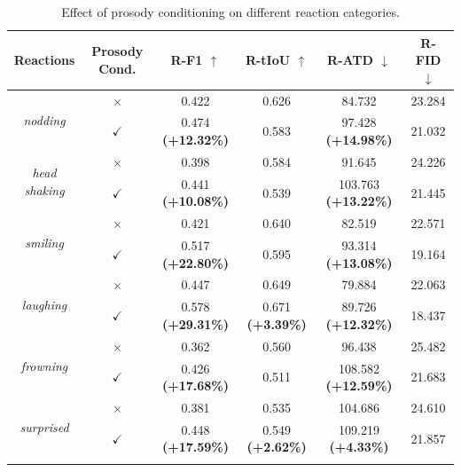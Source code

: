 \vspace{0.5em}
\begin{table}[t]
    \centering
    \fontsize{8pt}{6.5pt}\selectfont
    \setcellgapes{2pt}
    \makegapedcells
    \setlength{\tabcolsep}{2pt}
    \caption{Effect of prosody conditioning on different reaction categories.}
    \label{tab:prosody_conditioning}
    \begin{tabular}{c|c|c|c|c|c}
        \Xhline{1.2pt}
        
        \textbf{Reactions} & \textbf{Prosody Cond.} & \textbf{R-F1} $\uparrow$ & \textbf{R-tIoU} $\uparrow$ & \textbf{R-ATD} $\downarrow$ & \textbf{R-FID} $\downarrow$ \\
        \hline
        
        \multirow{2}{*}{\textit{nodding}} & $\times$ & 0.422 & 0.626 & 84.732 & 23.284 \\
         & $\checkmark$ & 0.474 \textbf{(+12.32\%)} & 0.583 & 97.428 \textbf{(+14.98\%)} & 21.032 \\

        \hline
        
        \multirow{2}{*}{\textit{head shaking}} & $\times$ & 0.398 & 0.584 & 91.645 & 24.226 \\
         & $\checkmark$ & 0.441 \textbf{(+10.08\%)} & 0.539 & 103.763 \textbf{(+13.22\%)} & 21.445 \\
        
        \hline
        
        \multirow{2}{*}{\textit{smiling}} & $\times$ & 0.421 & 0.640 & 82.519 & 22.571 \\
         & $\checkmark$ & 0.517 \textbf{(+22.80\%)} & 0.595 & 93.314 \textbf{(+13.08\%)} & 19.164 \\
        
        \hline
        
        \multirow{2}{*}{\textit{laughing}} & $\times$ & 0.447 & 0.649 & 79.884 & 22.063 \\
         & $\checkmark$ & 0.578 \textbf{(+29.31\%)} & 0.671 \textbf{(+3.39\%)} & 89.726 \textbf{(+12.32\%)} & 18.437 \\
        
        \hline
        
        \multirow{2}{*}{\textit{frowning}} & $\times$ & 0.362 & 0.560 & 96.438 & 25.482 \\
         & $\checkmark$ & 0.426 \textbf{(+17.68\%)} & 0.511 & 108.582 \textbf{(+12.59\%)} & 21.683 \\

        \hline
        
        \multirow{2}{*}{\textit{surprised}} & $\times$ & 0.381 & 0.535 & 104.686 & 24.610 \\
         & $\checkmark$ & 0.448 \textbf{(+17.59\%)} & 0.549 \textbf{(+2.62\%)} & 109.219 \textbf{(+4.33\%)} & 21.857 \\
        
        \Xhline{1.2pt}
    \end{tabular}
    \vspace{-1.5em}
\end{table}